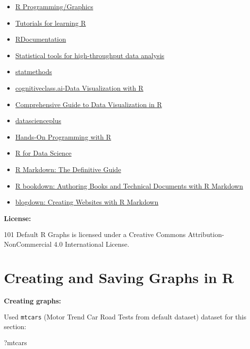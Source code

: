\documentclass[]{book}
\newenvironment{Shaded}{\begin{snugshade}}{\end{snugshade}}
\newcommand{\NormalTok}[1]{#1}
\providecommand{\tightlist}{%
  \setlength{\itemsep}{0pt}\setlength{\parskip}{0pt}}
\begin{document}
\begin{itemize}
\tightlist
\item
  \href{https://en.wikibooks.org/wiki/R_Programming/Graphics\#Points}{R
  Programming/Graphics}
\item
  \href{https://www.r-bloggers.com/how-to-learn-r-2/\#h.bosdu7kkoym}{Tutorials
  for learning R}
\item
  \href{https://www.rdocumentation.org/}{RDocumentation}
\item
  \href{http://www.sthda.com/english/}{Statistical tools for
  high-throughput data analysis}
\item
  \href{https://www.statmethods.net/index.html}{statmethods}
\item
  \href{https://cognitiveclass.ai/courses/data-visualization-with-r/}{cognitiveclass.ai-Data
  Visualization with R}
\item
  \href{https://www.analyticsvidhya.com/blog/2015/07/guide-data-visualization-r/}{Comprehensive
  Guide to Data Visualization in R}
\item
  \href{https://datascienceplus.com/}{datascienceplus}
\item
  \href{https://rstudio-education.github.io/hopr/}{Hands-On Programming
  with R}
\item
  \href{https://r4ds.had.co.nz/}{R for Data Science}
\item
  \href{https://bookdown.org/yihui/rmarkdown/}{R Markdown: The
  Definitive Guide}
\item
  \href{https://bookdown.org/yihui/bookdown/}{R bookdown: Authoring
  Books and Technical Documents with R Markdown}
\item
  \href{https://bookdown.org/yihui/blogdown/}{blogdown: Creating
  Websites with R Markdown}
\end{itemize}

\textbf{License: }

101 Default R Graphs is licensed under a Creative Commons
Attribution-NonCommercial 4.0 International License.

\chapter{Creating and Saving Graphs in
R}\label{creating-and-saving-graphs-in-r}

\textbf{Creating graphs: }

Used \texttt{mtcars} (Motor Trend Car Road Tests from default dataset)
dataset for this section:

\begin{Shaded}
\begin{Highlighting}[]
\NormalTok{?mtcars}
\end{Highlighting}
\end{Shaded}
\end{document}
